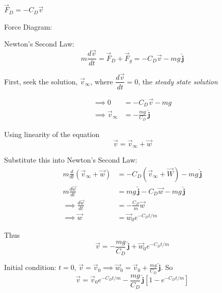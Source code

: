 \documentclass[twoside]{scrartcl}
\let\oldhat\hat
\renewcommand{\hat}[1]{\,\oldhat{\boldsymbol{\mathbf{#1}}}}
\begin{document}
\begin{example}
\begin{center}
\end{center}

$\vec{F}_D = -C_D\vec{v}$

Force Diagram:

\begin{center}
\end{center}


Newton's Second Law:
\[m\frac{d\vec{v}}{dt} = \vec{F}_D + \vec{F}_g = -C_D\vec{v} - mg\hat{j}\]

First, seek the solution, $\vec{v}_{\infty}$, where $\dfrac{d\vec{v}}{dt} = 0$, the \emph{steady state solution}

\[
\begin{aligned}
\implies 0 &=  -C_D\vec{v} - mg\\
\implies \vec{v}_{\infty} &= -\frac{mg}{C_D}\hat{j}
\end{aligned}\]

Using linearity of the equation
\[\vec{v} = \vec{v}_{\infty} + \vec{w}\]

Substitute this into Newton's Second Law:
\[\begin{aligned}
m\frac{d}{dt}(\vec{v}_{\infty} + \vec{w}) &= -C_D(\vec{v}_{\infty} + \vec{W}) - mg\hat{j}\\
m\frac{d\vec{w}}{dt} &= mg\hat{j} -C_D\vec{w} - mg\hat{j}\\
\implies \frac{d\vec{w}}{dt} &= -\frac{C_D}{m}\vec{w} \\
\implies \vec{w} &= \vec{w}_0e^{-C_Dt/m}
\end{aligned}\]

Thus 
\[\vec{v} = -\frac{mg}{C_D}\hat{j} + \vec{w}_0e^{-C_Dt/m}\]

Initial condition: $t= 0$, $\vec{v} = \vec{v}_0 \implies \vec{w}_0 = \vec{v}_0 + \frac{mg}{C_D}\hat{j}$. So
\[\vec{v} = \vec{v}_0e^{-C_Dt/m} - \frac{mg}{C_D}\hat{j}[1-e^{-C_Dt/m}]\]


\end{example}
\end{document}
